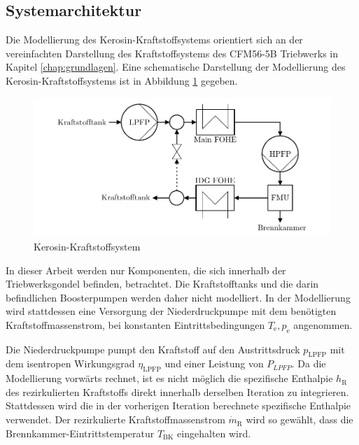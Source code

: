 \subsection{Systemarchitektur}

Die Modellierung des Kerosin-Kraftstoffsystems orientiert sich an der vereinfachten Darstellung des Kraftstoffsystems des CFM56-5B Triebwerks in Kapitel \ref{chap:grundlagen}. Eine schematische Darstellung der Modellierung des Kerosin-Kraftstoffsystems ist in Abbildung \ref{fig:Referenz} gegeben.

\begin{figure}[ht]
\centering
\includegraphics[width=1\linewidth]{4_Abbildungen/2_Hauptteil/Kraftstoffsystem Abbildungen/Referenz.pdf}
  \caption{Kerosin-Kraftstoffsystem}
  \label{fig:Referenz}
\end{figure}
\FloatBarrier 

In dieser Arbeit werden nur Komponenten, die sich innerhalb der Triebwerksgondel befinden, betrachtet. Die Kraftstofftanks und die darin befindlichen Boosterpumpen werden daher nicht modelliert. In der Modellierung wird stattdessen eine Versorgung der Niederdruckpumpe mit dem benötigten Kraftstoffmassenstrom, bei konstanten Eintrittsbedingungen $T_\mathrm{e}, p_\mathrm{e}$ angenommen. 

Die Niederdruckpumpe pumpt den Kraftstoff auf den Austrittsdruck $p_{\mathrm{LPFP}}$ mit dem isentropen Wirkungsgrad $\eta_{\mathrm{LPFP}}$ und einer Leistung von $P_{LPFP}$. Da die Modellierung vorwärts rechnet, ist es nicht möglich die spezifische Enthalpie $h_\mathrm{R}$ des rezirkulierten Kraftstoffs direkt innerhalb derselben Iteration zu integrieren. Stattdessen wird die in der vorherigen Iteration berechnete spezifische Enthalpie verwendet. Der rezirkulierte Kraftstoffmassenstrom $\dot{m}_\mathrm{R}$ wird so gewählt, dass die Brennkammer-Eintrittstemperatur $T_{\mathrm{BK}}$ eingehalten wird. 

